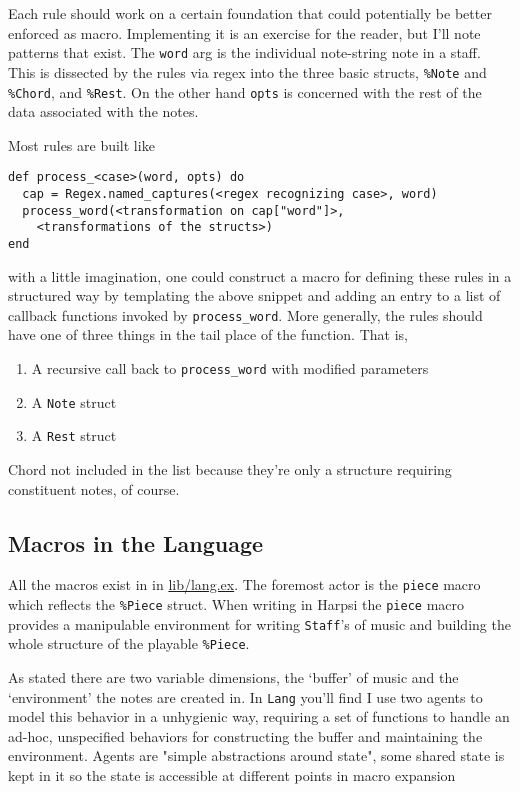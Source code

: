 \documentclass[11pt]{article}
\begin{document}
Each rule should work on a certain foundation that could
potentially be better enforced as macro. Implementing it is an
exercise for the reader, but I'll note patterns that exist. The
\verb~word~ arg is the individual note-string note in a staff. This is
dissected by the rules via regex into the three basic structs,
\verb~%Note~ and \verb~%Chord~, and \verb~%Rest~. On the other hand \verb~opts~ is
concerned with the rest of the data associated with the notes.

Most rules are built like
\begin{verbatim}
def process_<case>(word, opts) do
  cap = Regex.named_captures(<regex recognizing case>, word)
  process_word(<transformation on cap["word"]>,
    <transformations of the structs>)
end
\end{verbatim}
with a little imagination, one could construct a macro for defining
these rules in a structured way by templating the above snippet and
adding an entry to a list of callback functions invoked by
\verb~process_word~. More generally, the rules should have one of three
things in the tail place of the function. That is,
\begin{enumerate}
\item A recursive call back to \verb~process_word~ with modified parameters
\item A \verb~Note~ struct
\item A \verb~Rest~ struct
\end{enumerate}
Chord not included in the list because they're only a structure
requiring constituent notes, of course.
\subsection{Macros in the Language}
\label{sec-1-2}
All the macros exist in in \url{lib/lang.ex}. The foremost actor is
the \verb~piece~ macro which reflects the \verb~%Piece~ struct. When writing
in Harpsi the \verb~piece~ macro provides a manipulable environment for
writing \verb~Staff~'s of music and building the whole structure of the
playable \verb~%Piece~.

As stated there are two variable dimensions, the `buffer' of music
and the `environment' the notes are created in. In \verb~Lang~ you'll
find I use two agents to model this behavior in a unhygienic way,
requiring a set of functions to handle an ad-hoc, unspecified
behaviors for constructing the buffer and maintaining the
environment. Agents are "simple abstractions around state", some
shared state is kept in it so the state is accessible at different
points in macro expansion
\end{document}
